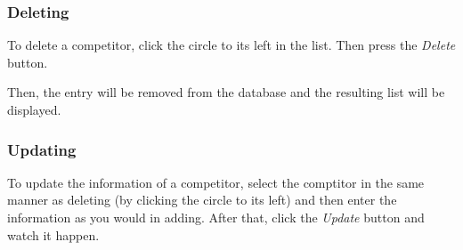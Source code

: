 \documentclass[a4paper,10pt,english]{sphinxmanual}
\begin{document}
\subsubsection{Deleting}
\label{user/member4:deleting}
To delete a competitor, click the circle to its left in the list. Then press the \emph{Delete} button.
\begin{quote}

\end{quote}

Then, the entry will be removed from the database and the resulting list will be displayed.


\subsubsection{Updating}
\label{user/member4:updating}
To update the information of a competitor, select the comptitor in the same manner as deleting (by clicking the circle to its left) and then enter the information as you would in adding. After that, click the \emph{Update} button and watch it happen.
\begin{quote}

\end{quote}
\end{document}
